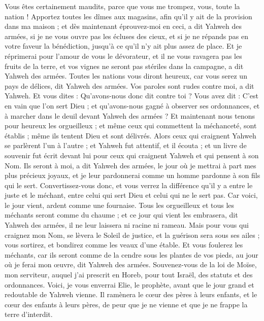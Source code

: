 \begin{multicols}{2}
Vous êtes certainement maudits, parce que vous me trompez, vous, toute la nation !
Apportez toutes les dîmes aux magasins, afin qu'il y ait de la provision dans ma maison ; et dès maintenant éprouvez-moi en ceci, a dit Yahweh des armées, si je ne vous ouvre pas les écluses des cieux, et si je ne répands pas en votre faveur la bénédiction, jusqu'à ce qu'il n'y ait plus assez de place.
Et je réprimerai pour l'amour de vous le dévorateur, et il ne vous ravagera pas les fruits de la terre, et vos vignes ne seront pas stériles dans la campagne, a dit Yahweh des armées.
Toutes les nations vous diront heureux, car vous serez un pays de délices, dit Yahweh des armées.
Vos paroles sont rudes contre moi, a dit Yahweh. Et vous dites : Qu'avons-nous donc dit contre toi ?
Vous avez dit : C'est en vain que l'on sert Dieu ; et qu'avons-nous gagné à observer ses ordonnances, et à marcher dans le deuil devant Yahweh des armées ?
Et maintenant nous tenons pour heureux les orgueilleux ; et même ceux qui commettent la méchanceté, sont établis ; même ils tentent Dieu et sont délivrés.
Alors ceux qui craignent Yahweh se parlèrent l'un à l'autre ; et Yahweh fut attentif, et il écouta ; et un livre de souvenir fut écrit devant lui pour ceux qui craignent Yahweh et qui pensent à son Nom.
Ils seront à moi, a dit Yahweh des armées, le jour où je mettrai à part mes plus précieux joyaux, et je leur pardonnerai comme un homme pardonne à son fils qui le sert.
Convertissez-vous donc, et vous verrez la différence qu'il y a entre le juste et le méchant, entre celui qui sert Dieu et celui qui ne le sert pas.
\VerseOne{}Car voici, le jour vient, ardent comme une fournaise. Tous les orgueilleux et tous les méchants seront comme du chaume ; et ce jour qui vient les embrasera, dit Yahweh des armées, il ne leur laissera ni racine ni rameau.
Mais pour vous qui craignez mon Nom, se lèvera le Soleil de justice, et la guérison sera sous ses ailes ; vous sortirez, et bondirez comme les veaux d'une étable.
Et vous foulerez les méchants, car ils seront comme de la cendre sous les plantes de vos pieds, au jour où je ferai mon œuvre, dit Yahweh des armées.
Souvenez-vous de la loi de Moïse, mon serviteur, auquel j'ai prescrit en Horeb, pour tout Israël, des statuts et des ordonnances.
Voici, je vous enverrai Elie, le prophète, avant que le jour grand et redoutable de Yahweh vienne.
Il ramènera le cœur des pères à leurs enfants, et le cœur des enfants à leurs pères, de peur que je ne vienne et que je ne frappe la terre d'interdit.
\PPE{}
\end{multicols}
